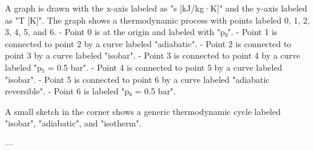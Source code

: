 A graph is drawn with the x-axis labeled as "s [kJ/kg·K]" and the y-axis labeled as "T [K]". The graph shows a thermodynamic process with points labeled 0, 1, 2, 3, 4, 5, and 6.  
- Point 0 is at the origin and labeled with "p₀".  
- Point 1 is connected to point 2 by a curve labeled "adiabatic".  
- Point 2 is connected to point 3 by a curve labeled "isobar".  
- Point 3 is connected to point 4 by a curve labeled "p₅ = 0.5 bar".  
- Point 4 is connected to point 5 by a curve labeled "isobar".  
- Point 5 is connected to point 6 by a curve labeled "adiabatic reversible".  
- Point 6 is labeled "p₆ = 0.5 bar".  

A small sketch in the corner shows a generic thermodynamic cycle labeled "isobar", "adiabatic", and "isotherm".  

---